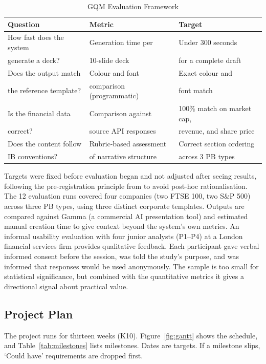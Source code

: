 \begin{table}[H]
\centering
\begin{tabular}{|l|l|l|}
\hline
\rowcolor{gray!20} \textbf{Question} & \textbf{Metric} & \textbf{Target} \\
\hline
How fast does the system & Generation time per & Under 300 seconds \\
generate a deck? & 10-slide deck & for a complete draft \\
\hline
Does the output match & Colour and font & Exact colour and \\
the reference template? & comparison (programmatic) & font match \\
\hline
Is the financial data & Comparison against & 100\% match on market cap, \\
correct? & source API responses & revenue, and share price \\
\hline
Does the content follow & Rubric-based assessment & Correct section ordering \\
IB conventions? & of narrative structure & across 3 PB types \\
\hline
\end{tabular}
\caption{GQM Evaluation Framework}
\label{tab:gqm}
\end{table}

Targets were fixed before evaluation began and not adjusted after seeing results, following the pre-registration principle from \textcite{wohlin2012} to avoid post-hoc rationalisation. The 12 evaluation runs covered four companies (two FTSE 100, two S\&P 500) across three PB types, using three distinct corporate templates. Outputs are compared against Gamma (a commercial AI presentation tool) and estimated manual creation time to give context beyond the system's own metrics. An informal usability evaluation with four junior analysts (P1--P4) at a London financial services firm provides qualitative feedback. Each participant gave verbal informed consent before the session, was told the study's purpose, and was informed that responses would be used anonymously. The sample is too small for statistical significance, but combined with the quantitative metrics it gives a directional signal about practical value.

\subsection{Project Plan}

The project runs for thirteen weeks (K10). Figure~\ref{fig:gantt} shows the schedule, and Table~\ref{tab:milestones} lists milestones. Dates are targets. If a milestone slips, `Could have' requirements are dropped first.

